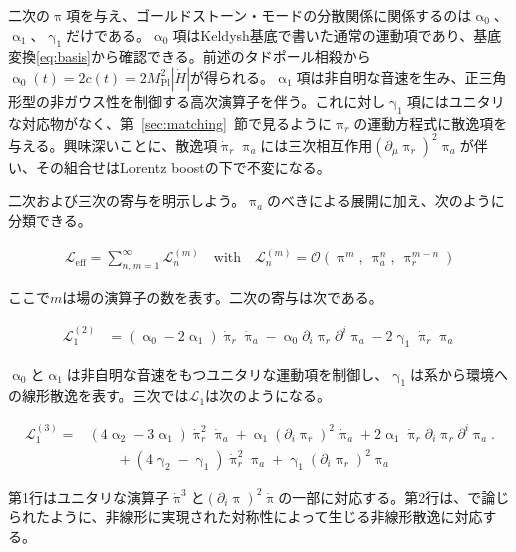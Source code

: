 \documentclass[a4paper,11pt]{ltjsarticle}
\numberwithin{equation}{section}
\newcommand{\Sec}[1]{Sec.~\ref{#1}}
\renewcommand{\Sec}[1]{第~\ref{#1}~節}
\begin{document}
二次の$\uppi$項を与え、ゴールドストーン・モードの分散関係に関係するのは$\upalpha_0$、$\upalpha_1$、$\upgamma_1$だけである\cite{Hongo:2018ant}。$\upalpha_0$項はKeldysh基底で書いた通常の運動項であり、基底変換\eqref{eq:basis}から確認できる。前述のタドポール相殺から$\upalpha_0(t)=2c(t)=2M_{\mathrm{Pl}}^2|\dot H|$が得られる。$\upalpha_1$項は非自明な音速を生み、正三角形型の非ガウス性を制御する高次演算子を伴う\cite{Cheung:2007st}。これに対し$\upgamma_1$項にはユニタリな対応物がなく、\Sec{sec:matching}で見るように$\uppi_r$の運動方程式に散逸項を与える。興味深いことに、散逸項$\dot{\uppi}_r\uppi_a$には三次相互作用$(\partial_\mu\uppi_r)^2\uppi_a$が伴い\cite{LopezNacir:2011kk}、その組合せはLorentz boostの下で不変になる。

二次および三次の寄与を明示しよう。$\uppi_a$のべきによる展開に加え、次のように分類できる。

\begin{align}
        \mathcal{L}_{\mathrm{eff}} = \sum_{n,m=1}^\infty  \mathcal{L}^{(m)}_n \quad\mathrm{with}\quad \mathcal{L}^{(m)}_n = \mathcal{O}(\uppi^m,~\uppi_{a}^n,~ \uppi_r^{m-n})
    \end{align}

ここで$m$は場の演算子の数を表す。二次の寄与は次である。

\begin{align}
        \mathcal{L}_1^{(2)} &= \left( \upalpha_0 -2 \upalpha_1\right) \dot{\uppi}_{r} \dot{\uppi}_{a} - \upalpha_0 \partial_i \uppi_{r}  \partial^i \uppi_{a} - 2 \upgamma_1  \dot{\uppi}_{r} \uppi_a
    \end{align}

$\upalpha_0$と$\upalpha_1$は非自明な音速をもつユニタリな運動項を制御し、$\upgamma_1$は系から環境への線形散逸を表す。三次では$\mathcal{L}_1$は次のようになる。

\begin{align}\label{eq:cubicinter}
        \mathcal{L}_1^{(3)} =  &\left(4 \upalpha_2 -3\upalpha_1 \right) \dot{\uppi}^2_{r} \dot{\uppi}_{a} + \upalpha_1 \left(\partial_i \uppi_{r} \right)^2 \dot{\uppi}_a + 2 \upalpha_1  \dot{\uppi}_{r}	\partial_i \uppi_{r}  \partial^i \uppi_{a} \Big.\nonumber \\
        &\qquad + \left(4 \upgamma_2 -\upgamma_1 \right)  \dot{\uppi}^2_{r} \uppi_{a}	+ \upgamma_1 	\left(\partial_i \uppi_{r} \right)^2 \uppi_a 
    \end{align}

第1行はユニタリな演算子$\dot{\uppi}^3$と$(\partial_i\uppi)^2\dot{\uppi}$の一部に対応する。第2行は、\cite{LopezNacir:2011kk}で論じられたように、非線形に実現された対称性によって生じる非線形散逸に対応する。
\end{document}

